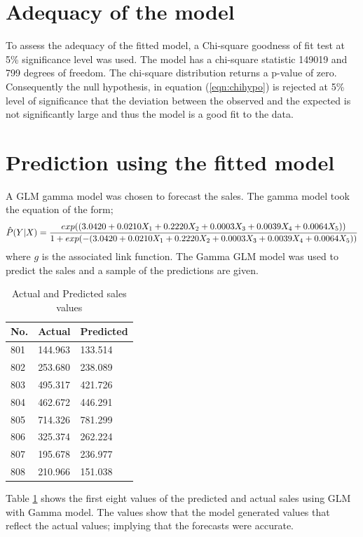 \section{Adequacy of the model}
To assess the adequacy of the fitted model, a Chi-square goodness of fit test at 5\% significance level was used. The model has a chi-square statistic 149019 and 799 degrees of freedom. The chi-square distribution returns a p-value of zero. Consequently the null hypothesis, in equation (\ref{eqn:chihypo}) is rejected at 5\% level of significance that the deviation between the observed and the expected is not significantly large and thus the model is a good fit to the data. 

\section{Prediction using the fitted model}
A GLM gamma model was chosen to forecast the sales. The gamma model took the equation of the form;
\begin{equation}
\centering
\label{eqn:forecasteqn}
	\hat{P}(Y|X) = \frac{exp((3.0420 + 0.0210 X_{1} + 0.2220 X_{2} + 0.0003 X_{3} + 0.0039 X_{4} + 0.0064 X_{5}))}{1+ exp(-(3.0420 + 0.0210 X_{1} + 0.2220 X_{2} + 0.0003 X_{3} + 0.0039 X_{4} + 0.0064 X_{5}))}
\end{equation}
where $g$ is the associated link function.
The Gamma GLM model was used to predict the sales and a sample of the predictions are given.
\begin{table}[H]
	\centering
	\caption{Actual and Predicted sales values}
	\begin{tabular}{lll}
		\hline
		No. & Actual  & Predicted \\ \hline
		801 & 144.963 & 133.514   \\
		802 & 253.680 & 238.089   \\
		803 & 495.317 & 421.726   \\
		804 & 462.672 & 446.291   \\
		805 & 714.326 & 781.299   \\
		806 & 325.374 & 262.224   \\
		807 & 195.678 & 236.977   \\
		808 & 210.966 & 151.038   \\ \hline
	\end{tabular}
\label{table:values}
\end{table}
Table \ref{table:values} shows the first eight values of the predicted and actual sales using GLM with Gamma model. The values show that the model generated values that reflect the actual values; implying that the forecasts were accurate. 
